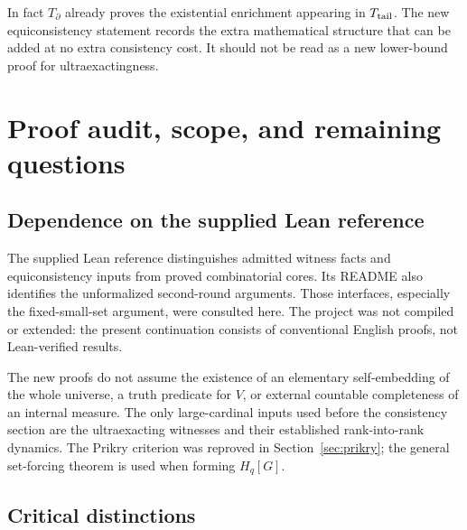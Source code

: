 \documentclass[11pt,letterpaper]{article}
\theoremstyle{definition}
\numberwithin{equation}{section}
\begin{document}
In fact $T_{\partial}$ already proves the existential enrichment appearing in $T_{\rm tail}$. The new equiconsistency statement records the extra mathematical structure that can be added at no extra consistency cost. It should not be read as a new lower-bound proof for ultraexactingness.

\section{Proof audit, scope, and remaining questions}\label{sec:audit}

\subsection{Dependence on the supplied Lean reference}

The supplied Lean reference distinguishes admitted witness facts and equiconsistency inputs from proved combinatorial cores. Its README also identifies the unformalized second-round arguments. Those interfaces, especially the fixed-small-set argument, were consulted here. The project was not compiled or extended: the present continuation consists of conventional English proofs, not Lean-verified results.

The new proofs do not assume the existence of an elementary self-embedding of the whole universe, a truth predicate for $V$, or external countable completeness of an internal measure. The only large-cardinal inputs used before the consistency section are the ultraexacting witnesses and their established rank-into-rank dynamics. The Prikry criterion was reproved in Section~\ref{sec:prikry}; the general set-forcing theorem is used when forming $H_q[G]$.

\subsection{Critical distinctions}
\end{document}
